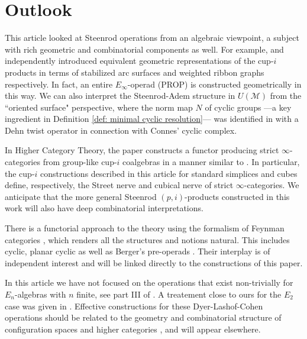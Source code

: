 \documentclass[A4]{amsart}
\theoremstyle{definition}
\begin{document}
\section{Outlook}
This article looked at Steenrod operations from an algebraic viewpoint, a subject with rich geometric and combinatorial components as well. For example, \cite{Postnikov} and \cite{medina2018prop2} independently introduced equivalent geometric representations of the cup-$i$ products in terms of stabilized arc surfaces \cite{KLP} and weighted ribbon graphs respectively. In fact, an entire $E_\infty$-operad (PROP) is constructed geometrically in this way. We can also interpret the Steenrod-Adem structure in $U(\mathcal M)$ from the ``oriented surface" perspective, where the norm map $N$ of cyclic groups ---a key ingredient in Definition \ref{def: minimal cyclic resolution}--- was identified in \cite{KLP} with a Dehn twist operator in connection with Connes' cyclic complex.

In Higher Category Theory, the paper \cite{medina2020globular} constructs a functor producing strict \mbox{$\infty$-cat}egories from group-like cup-$i$ coalgebras in a manner similar to \cite{steiner2004omega}. In particular, the cup-$i$ constructions described in this article for standard simplices and cubes define, respectively, the Street nerve and cubical nerve of strict $\infty$-categories. We anticipate that the more general Steenrod $(p,i)$-products constructed in this work will also have deep combinatorial interpretations.

There is a functorial approach to the theory using the formalism of Feynman categories \cite{feynman},
which renders all the structures and notions natural. This includes cyclic, planar cyclic as well as Berger's pre-operads \cite{BergerRecog}. Their interplay is of independent interest \cite{BergerKaufmann,feyrep} and will be linked directly to the constructions of this paper.

In this article we have not focused on the operations that exist non-trivially for \mbox{$E_n$-algebras} with $n$ finite, see part III of \cite{may76homology}. A treatement close to ours for the $E_2$ case was given in \cite{Tourtchine}. Effective constructions for these Dyer-Lashof-Cohen operations should be related to the geometry and combinatorial structure of configuration spaces \cite{KZhang,sinha2013littledisks,berger04combinatorial,ayala2014configuration} and higher categories \cite{Bathigher,BalFiedSchwVogt,Rezkhigher}, and will appear elsewhere.
\end{document}
